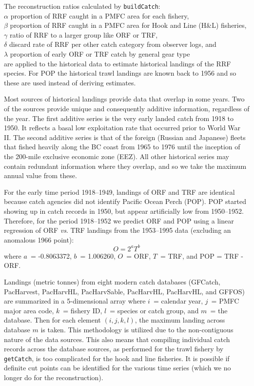 \documentclass[letterpaper,12pt,fleqn]{article}
\def\tab{\hspace{0.5 in}}
\newcommand{\code}[1]{\small\texttt{#1}\normalsize}
\newcommand{\eqn}[1]{\begin{equation}#1\end{equation}}
\newcommand{\db}[1]{\small\textmd{\textsf{#1}}\normalsize}
\begin{document}
\tab The reconstruction ratios calculated by \code{buildCatch}:\\
$\alpha$ proportion of RRF caught in a PMFC area for each fishery,\\
$\beta$ proportion of RRF caught in a PMFC area for Hook and Line (H\&L) fisheries,\\
$\gamma$ ratio of RRF to a larger group like ORF or TRF,\\
$\delta$ discard rate of RRF per other catch category from observer logs, and\\
$\lambda$ proportion of early ORF or TRF catch by general gear type\\
are applied to the historical data to estimate historical landings of the RRF species. For POP the historical trawl landings are known back to 1956 and so these are used instead of deriving estimates.

\tab Most sources of historical landings provide data that overlap in some years. Two of the sources provide unique and consequently additive information, regardless of the year. The first additive series is the very early landed catch from 1918 to 1950. It reflects a basal low exploitation rate that occurred prior to World War II. The second additive series is that of the foreign (Russian and Japanese) fleets that fished heavily along the BC coast from 1965 to 1976 until the inception of the 200-mile exclusive economic zone (EEZ). All other historical series may contain redundant information where they overlap, and so we take the maximum annual value from these.

\tab For the early time period 1918--1949, landings of ORF and TRF are identical because catch agencies did not identify Pacific Ocean Perch (POP). POP started showing up in catch records in 1950, but appear artificially low from 1950--1952. Therefore, for the period 1918--1952 we predict ORF and POP using a linear regression of ORF \emph{vs}. TRF landings from the 1953--1995 data (excluding an anomalous 1966 point):
%
\eqn{O = 2^a T^b}
%
where $a$~= -0.8063372, $b$~= 1.006260, $O$~= ORF, $T$~= TRF, and POP = TRF - ORF.

\tab Landings (metric tonnes) from eight modern catch databases (\db{GFCatch}, \db{PacHarvest}, \db{PacHarvHL}, \db{PacHarvSable}, \db{PacHarvHL}, \db{PacHarvHL}, and \db{GFFOS}) are summarized in a 5-dimensional array where $i$~= calendar year, $j$~= PMFC major area code, $k$~= fishery ID, $l$~= species or catch group, and $m$~= the database. Then for each element $(i,j,k,l)$, the maximum landing across database $m$ is taken. This methodology is utilized due to the non-contiguous nature of the data sources. This also means that compiling individual catch records across the database sources, as performed for the trawl fishery by \code{getCatch}, is too complicated for the hook and line fisheries. It is possible if definite cut points can be identified for the various time series (which we no longer do for the reconstruction).
\end{document}
